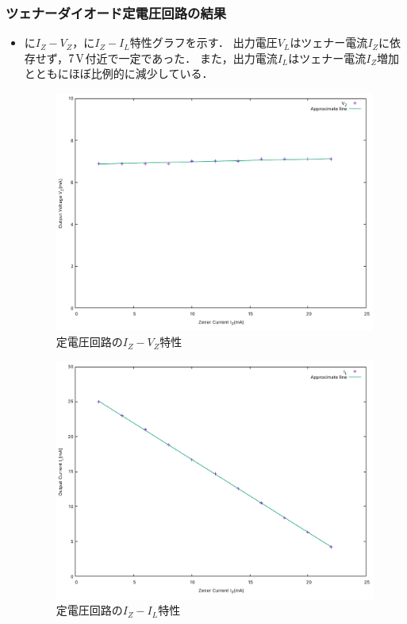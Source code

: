 \subsubsection{ツェナーダイオード定電圧回路の結果}
\begin{itemize}
	\item {}に$I_{Z}-V_{Z}$，に$I_{Z}-I_{L}$特性グラフを示す．
出力電圧$V_L$はツェナー電流$I_Z$に依存せず，$7\,\rm{V}$付近で一定であった．
また，出力電流$I_{L}$はツェナー電流$I_Z$増加とともにほぼ比例的に減少している．
\begin{figure}[h]
	\centering
	\includegraphics[scale=0.65]{./data/zener/zener-const-1.pdf}
	\caption{定電圧回路の$I_Z-V_Z$特性}
	\label{fig:zener-const-1}
\end{figure}
\begin{figure}[h]
	\centering
	\includegraphics[scale=0.65]{./data/zener/zener-const-2.pdf}
	\caption{定電圧回路の$I_Z-I_L$特性}
	\label{fig:zener-const-2}
\end{figure}
\end{itemize}


